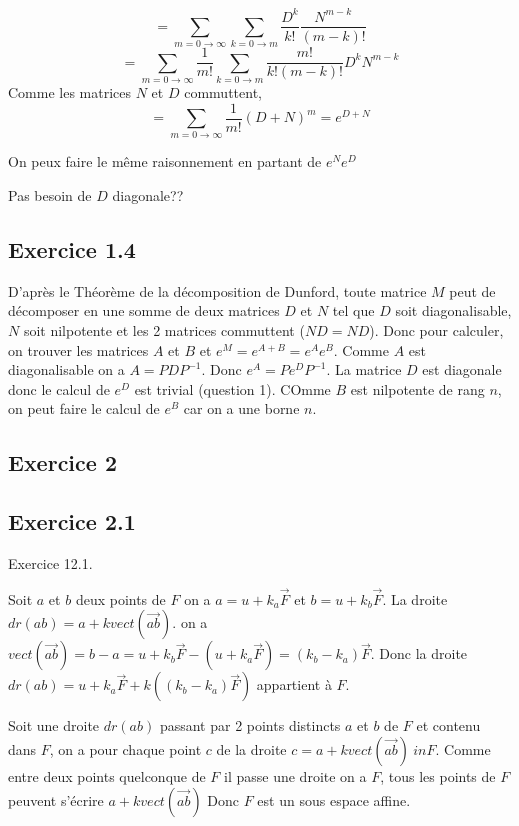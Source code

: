 \documentclass[]{book}
\theoremstyle{definition}
\begin{document}
$$
= \sum_{m = 0 \to \infty}\sum_{k = 0 \to m}{\frac{D^k}{k!}\frac{N^{m-k}}{(m-k)!}}
$$
$$
= \sum_{m = 0 \to \infty}\frac{1}{m!}\sum_{k = 0 \to m}{\frac{m!}{k!(m-k)!}D^kN^{m-k}}
$$
Comme les matrices $N$ et $D$ commuttent,
$$
= \sum_{m = 0 \to \infty}{\frac{1}{m!}(D+N)^m} = e^{D+N}
$$

On peux faire le m\^eme raisonnement en partant de $e^Ne^D$

Pas besoin de $D$ diagonale??

\subsection*{Exercice 1.4}
D'apr\`es le Th\'eor\`eme de la d\'ecomposition de Dunford, toute matrice $M$ peut de d\'ecomposer en une somme de deux matrices $D$ et $N$ tel que $D$ soit diagonalisable, $N$ soit nilpotente et les 2 matrices commuttent ($ND = ND$).
Donc pour calculer, on trouver les matrices $A$ et $B$ et $e^M= e^{A+B} = e^Ae^B$. Comme $A$ est diagonalisable on a $A=PDP^{-1}$. Donc $e^A = Pe^DP^{-1}$. La matrice $D$ est diagonale donc le calcul de $e^D$ est trivial (question 1). COmme $B$ est nilpotente de rang $n$, on peut faire le calcul de $e^B$ car on a une borne $n$.

\subsection*{Exercice 2}
\subsection*{Exercice 2.1}

Exercice 12.1.

Soit $a$ et $b$ deux points de $F$ on a $a = u + k_a\overrightarrow{F}$ et $b = u + k_b\overrightarrow{F}$. La droite $dr(ab) = a + k vect(\overrightarrow{ab})$. on a $vect(\overrightarrow{ab}) = b - a =  u + k_b\overrightarrow{F} - (u + k_a\overrightarrow{F}) = (k_b - k_a)\overrightarrow{F}$. Donc la droite $dr(ab) = u + k_a\overrightarrow{F} + k((k_b - k_a)\overrightarrow{F})$ appartient \`a $F$.

Soit une droite $dr(ab)$ passant par 2 points distincts $a$ et $b$ de $F$ et contenu dans $F$, on a pour chaque point $c$ de la droite $c = a + k vect(\overrightarrow{ab}) \ in F$.  Comme entre deux points quelconque de $F$ il passe une droite on a $F$, tous les points de $F$ peuvent s'\'ecrire $a + k vect(\overrightarrow{ab})$ Donc $F$ est un sous espace affine. 
\end{document}
